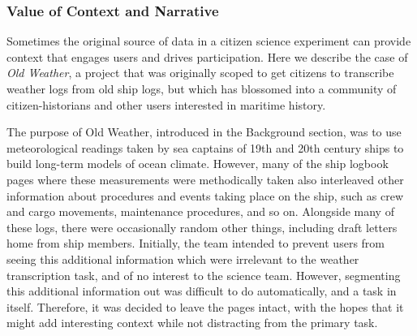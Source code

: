 \documentclass{sigchi}
\begin{document}



\subsubsection{Value of Context and Narrative}
Sometimes the original source of data in a citizen science experiment can provide context that engages users and drives participation.  Here we describe the case of \emph{Old Weather}, a project that was originally scoped to get citizens to transcribe weather logs from old ship logs, but which has blossomed into a community of citizen-historians and other users interested in maritime history. 

The purpose of Old Weather, introduced in the Background section, was to use meteorological readings taken by sea captains of 19th and 20th century ships to build long-term models of ocean climate. However, many of the ship logbook pages where these measurements were methodically taken also interleaved other information about procedures and events taking place on the ship, such as crew and cargo movements, maintenance procedures, and so on.  Alongside many of these logs, there were occasionally random other things, including draft letters home from ship members.  Initially, the team intended to prevent users from seeing this additional information which were irrelevant to the weather transcription task, and of no interest to the science team. However, segmenting this additional information out was difficult to do automatically, and a task in itself.  Therefore, it was decided to leave the pages intact, with the hopes that it might add interesting context while not distracting from the primary task. 
\end{document}
